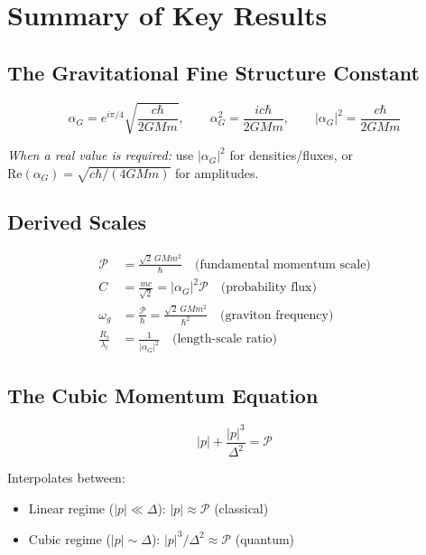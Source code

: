 \documentclass[11pt,a4paper]{article}
\theoremstyle{definition}
\theoremstyle{remark}
\begin{document}
	\section{Summary of Key Results}
	
	\subsection{The Gravitational Fine Structure Constant}
	
	\begin{equation}
		\boxed{\alpha_G = e^{i\pi/4}\sqrt{\frac{c\hbar}{2GMm}}, \qquad \alpha_G^2 = \frac{ic\hbar}{2GMm}, \qquad |\alpha_G|^2 = \frac{c\hbar}{2GMm}}
	\end{equation}
	
	\emph{When a real value is required:} use $|\alpha_G|^2$ for densities/fluxes, or $\mathrm{Re}(\alpha_G)=\sqrt{c\hbar/(4GMm)}$ for amplitudes.
	
	\subsection{Derived Scales}
	
	\begin{align}
		\mathcal{P} &= \frac{\sqrt{2}\,GMm^2}{\hbar} \quad\text{(fundamental momentum scale)} \\
		C &= \frac{mc}{\sqrt{2}} = |\alpha_G|^2\mathcal{P} \quad\text{(probability flux)} \\
		\omega_g &= \frac{\mathcal{P}}{\hbar} = \frac{\sqrt{2}\,GMm^2}{\hbar^2} \quad\text{(graviton frequency)} \\
		\frac{R_s}{\lambda_c} &= \frac{1}{|\alpha_G|^2} \quad\text{(length-scale ratio)}
	\end{align}
	
	\subsection{The Cubic Momentum Equation}
	
	\begin{equation}
		\boxed{|p| + \frac{|p|^3}{\Delta^2} = \mathcal{P}}
	\end{equation}
	
	Interpolates between:
	\begin{itemize}
		\item Linear regime ($|p|\ll\Delta$): $|p|\approx\mathcal{P}$ (classical)
		\item Cubic regime ($|p|\sim\Delta$): $|p|^3/\Delta^2\approx\mathcal{P}$ (quantum)
	\end{itemize}
	
\end{document}
